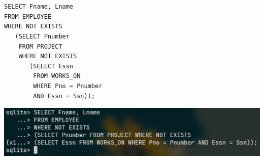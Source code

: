 \documentclass{article}
\begin{document}
	\section{}
	\begin{verbatim}
SELECT Fname, Lname
FROM EMPLOYEE
WHERE NOT EXISTS
   (SELECT Pnumber
    FROM PROJECT
    WHERE NOT EXISTS
       (SELECT Essn
        FROM WORKS_ON
        WHERE Pno = Pnumber
        AND Essn = Ssn));
	\end{verbatim}
	\begin{center}
		\includegraphics[scale=0.25]{4.png}
	\end{center}
\end{document}
